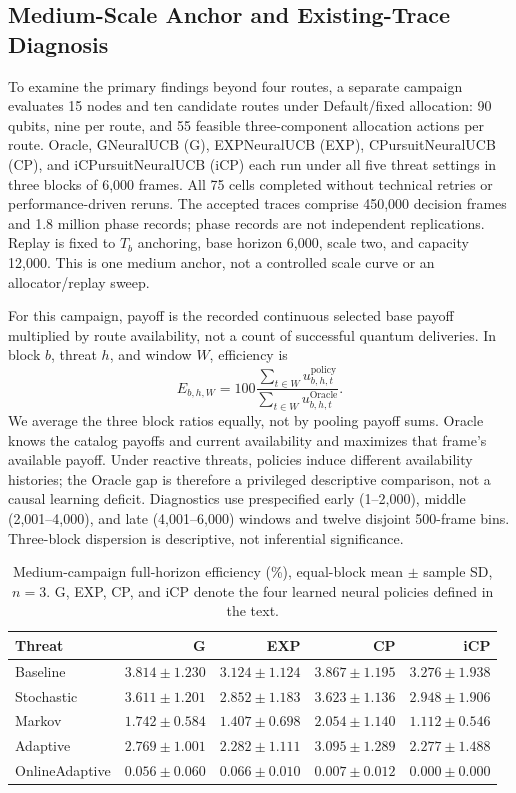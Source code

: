 \subsection{Medium-Scale Anchor and Existing-Trace Diagnosis}
\label{sec:medium_evidence}

To examine the primary findings beyond four routes, a separate campaign evaluates 15 nodes and ten candidate routes under Default/fixed allocation: 90 qubits, nine per route, and 55 feasible three-component allocation actions per route. Oracle, GNeuralUCB (G), EXPNeuralUCB (EXP), CPursuitNeuralUCB (CP), and iCPursuitNeuralUCB (iCP) each run under all five threat settings in three blocks of 6,000 frames. All 75 cells completed without technical retries or performance-driven reruns. The accepted traces comprise 450,000 decision frames and 1.8 million phase records; phase records are not independent replications. Replay is fixed to $T_b$ anchoring, base horizon 6,000, scale two, and capacity 12,000. This is one medium anchor, not a controlled scale curve or an allocator/replay sweep.

For this campaign, payoff is the recorded continuous selected base payoff multiplied by route availability, not a count of successful quantum deliveries. In block $b$, threat $h$, and window $W$, efficiency is
\[
E_{b,h,W}=100\frac{\sum_{t\in W}u^{\mathrm{policy}}_{b,h,t}}
{\sum_{t\in W}u^{\mathrm{Oracle}}_{b,h,t}}.
\]
We average the three block ratios equally, not by pooling payoff sums. Oracle knows the catalog payoffs and current availability and maximizes that frame's available payoff. Under reactive threats, policies induce different availability histories; the Oracle gap is therefore a privileged descriptive comparison, not a causal learning deficit. Diagnostics use prespecified early (1--2,000), middle (2,001--4,000), and late (4,001--6,000) windows and twelve disjoint 500-frame bins. Three-block dispersion is descriptive, not inferential significance.

\begin{table}[t]
\centering\scriptsize
\setlength{\tabcolsep}{2pt}
\caption{Medium-campaign full-horizon efficiency (\%), equal-block mean $\pm$ sample SD, $n=3$. G, EXP, CP, and iCP denote the four learned neural policies defined in the text.}
\label{tab:medium_efficiency}
\begin{tabular}{lrrrr}
\toprule
Threat & G & EXP & CP & iCP\\
\midrule
Baseline & $3.814\pm1.230$ & $3.124\pm1.124$ & $3.867\pm1.195$ & $3.276\pm1.938$\\
Stochastic & $3.611\pm1.201$ & $2.852\pm1.183$ & $3.623\pm1.136$ & $2.948\pm1.906$\\
Markov & $1.742\pm0.584$ & $1.407\pm0.698$ & $2.054\pm1.140$ & $1.112\pm0.546$\\
Adaptive & $2.769\pm1.001$ & $2.282\pm1.111$ & $3.095\pm1.289$ & $2.277\pm1.488$\\
OnlineAdaptive & $0.056\pm0.060$ & $0.066\pm0.010$ & $0.007\pm0.012$ & $0.000\pm0.000$\\
\bottomrule
\end{tabular}
\end{table}

